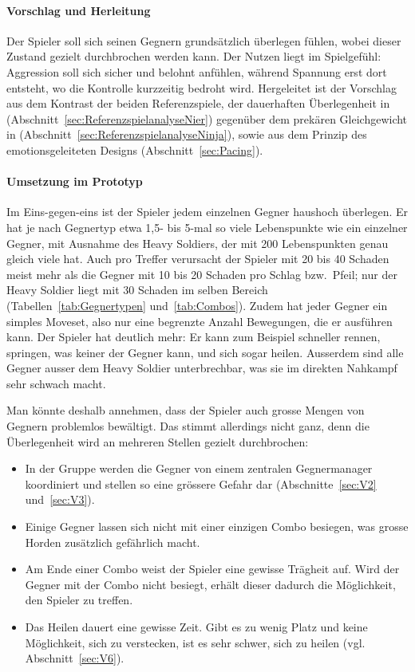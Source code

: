 \documentclass[../Main.tex]{subfiles}
\begin{document}
\paragraph{Vorschlag und Herleitung}
Der Spieler soll sich seinen Gegnern grundsätzlich überlegen fühlen, wobei dieser Zustand gezielt durchbrochen werden kann. Der Nutzen liegt im Spielgefühl: Aggression soll sich sicher und belohnt anfühlen, während Spannung erst dort entsteht, wo die Kontrolle kurzzeitig bedroht wird. Hergeleitet ist der Vorschlag aus dem Kontrast der beiden Referenzspiele, der dauerhaften Überlegenheit in  (Abschnitt~\ref{sec:ReferenzspielanalyseNier}) gegenüber dem prekären Gleichgewicht in  (Abschnitt~\ref{sec:ReferenzspielanalyseNinja}), sowie aus dem Prinzip des emotionsgeleiteten Designs (Abschnitt~\ref{sec:Pacing}).

\paragraph{Umsetzung im Prototyp}
Im Eins-gegen-eins ist der Spieler jedem einzelnen Gegner haushoch überlegen. Er hat je nach Gegnertyp etwa 1,5- bis 5-mal so viele Lebenspunkte wie ein einzelner Gegner, mit Ausnahme des Heavy Soldiers, der mit 200 Lebenspunkten genau gleich viele hat. Auch pro Treffer verursacht der Spieler mit 20 bis 40 Schaden meist mehr als die Gegner mit 10 bis 20 Schaden pro Schlag bzw.\ Pfeil; nur der Heavy Soldier liegt mit 30 Schaden im selben Bereich (Tabellen~\ref{tab:Gegnertypen} und~\ref{tab:Combos}). Zudem hat jeder Gegner ein simples Moveset, also nur eine begrenzte Anzahl Bewegungen, die er ausführen kann. Der Spieler hat deutlich mehr: Er kann zum Beispiel schneller rennen, springen, was keiner der Gegner kann, und sich sogar heilen. Ausserdem sind alle Gegner ausser dem Heavy Soldier unterbrechbar, was sie im direkten Nahkampf sehr schwach macht.

Man könnte deshalb annehmen, dass der Spieler auch grosse Mengen von Gegnern problemlos bewältigt. Das stimmt allerdings nicht ganz, denn die Überlegenheit wird an mehreren Stellen gezielt durchbrochen:

\begin{itemize}[leftmargin=1.5cm]
    \item In der Gruppe werden die Gegner von einem zentralen Gegnermanager koordiniert und stellen so eine grössere Gefahr dar (Abschnitte~\ref{sec:V2} und~\ref{sec:V3}).
    \item Einige Gegner lassen sich nicht mit einer einzigen Combo besiegen, was grosse Horden zusätzlich gefährlich macht.
    \item Am Ende einer Combo weist der Spieler eine gewisse Trägheit auf. Wird der Gegner mit der Combo nicht besiegt, erhält dieser dadurch die Möglichkeit, den Spieler zu treffen.
    \item Das Heilen dauert eine gewisse Zeit. Gibt es zu wenig Platz und keine Möglichkeit, sich zu verstecken, ist es sehr schwer, sich zu heilen (vgl. Abschnitt~\ref{sec:V6}).
\end{itemize}
\end{document}
